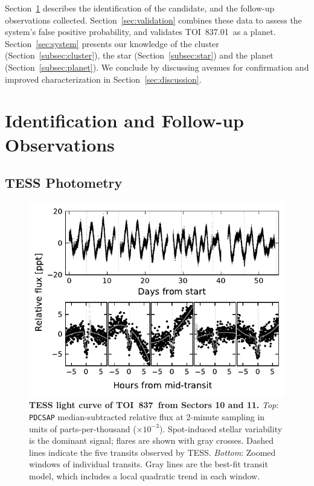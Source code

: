 \documentclass[12pt,twocolumn,tighten]{aastex63}
\newcommand{\tn}{TOI~837} %
\newcommand{\pn}{TOI~837.01} %
\begin{document}
Section~\ref{sec:observations} describes the identification of the
candidate, and the follow-up observations collected.
Section~\ref{sec:validation} combines these data to assess the
system's false positive probability, and validates \pn\ as a planet.
Section~\ref{sec:system} presents our knowledge of the cluster
(Section~\ref{subsec:cluster}), the star (Section~\ref{subsec:star})
and the planet (Section~\ref{subsec:planet}).  We conclude by
discussing avenues for confirmation and improved characterization in
Section~\ref{sec:discussion}.



\section{Identification and Follow-up Observations}
\label{sec:observations}


\subsection{TESS Photometry}
\label{subsec:tess}

\begin{figure}[!t]
	\begin{center}
		\leavevmode
		\includegraphics[width=.9\textwidth]{f1.pdf}
	\end{center}
	\vspace{-0.7cm}
	\caption{
    {\bf TESS light curve of \tn\ from Sectors 10 and 11.} {\it Top}:
    \texttt{PDCSAP} median-subtracted relative flux at 2-minute
    sampling in units of parts-per-thousand ($\times 10^{-3}$).
    Spot-induced stellar variability is the dominant signal; flares
    are shown with gray crosses.  Dashed lines indicate the five
    transits observed by TESS.  {\it Bottom}: Zoomed windows of
    individual transits.  Gray lines are the best-fit transit model,
    which includes a local quadratic trend in each window.
		\label{fig:rawzoom}
	}
\end{figure}
\end{document}
